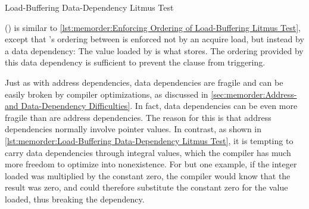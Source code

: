 \begin{listing}

\caption{Load-Buffering Data-Dependency Litmus Test}
\label{lst:memorder:Load-Buffering Data-Dependency Litmus Test}
\end{listing}

\begin{fcvref}
()
is similar to
\cref{lst:memorder:Enforcing Ordering of Load-Buffering Litmus Test},
except that 's ordering between  is
enforced not by an acquire load, but instead by a data dependency:
The value loaded by  is what  stores.
The ordering provided by this data dependency is sufficient to prevent
the  clause from triggering.
\end{fcvref}

Just as with address dependencies, data dependencies are
fragile and can be easily broken by compiler optimizations, as discussed in
\cref{sec:memorder:Address- and Data-Dependency Difficulties}.
In fact, data dependencies can be even more fragile than are address
dependencies.
The reason for this is that address dependencies normally involve
pointer values.
In contrast, as shown in
\cref{lst:memorder:Load-Buffering Data-Dependency Litmus Test},
it is tempting to carry data dependencies through integral values,
which the compiler has much more freedom to optimize into nonexistence.
For but one example, if the integer loaded was multiplied by the constant
zero, the compiler would know that the result was zero, and could therefore
substitute the constant zero for the value loaded, thus breaking
the dependency.

\QuickQuizEnd

